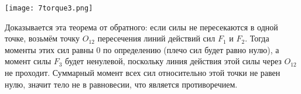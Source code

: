 \documentclass[12pt, a4paper]{article}%
\begin{document}
\begin{center}
\texttt{[image: 7torque3.png]}
\label{fig:mpr}
\end{center}



Доказывается эта теорема от обратного: если силы не пересекаются в одной точке, возьмём точку $O_{12}$ пересечения линий действий сил $F_1$ и $F_2$. 
Тогда моменты этих сил равны $0$ по определению (плечо сил будет равно нулю), а момент силы $F_3$ будет ненулевой, поскольку линия действия этой силы через $O_{12}$ не проходит. Суммарный момент всех сил относительно этой точки не равен нулю, значит тело не в равновесии, что является противоречием.
\end{document}
